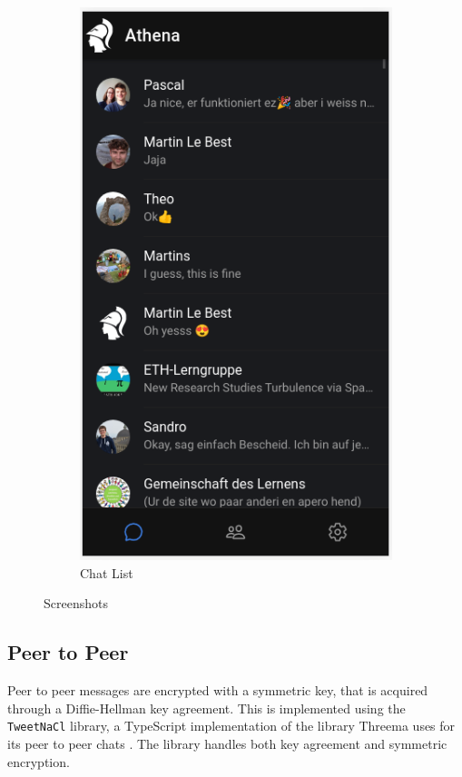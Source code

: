 \documentclass[a4paper, oneside]{discothesis}
\begin{document}
\begin{figure}[h]
\begin{subfigure}{.5\textwidth}
  \includegraphics[width=.8\linewidth]{figures/chats.png}
  \caption{Chat List}
  \label{fig:chats}
\end{subfigure}
\caption{Screenshots}
\label{fig:screenshots}
\end{figure}

\subsection{Peer to Peer}

Peer to peer messages are encrypted with a symmetric key, that is acquired through a Diffie-Hellman key agreement. This is implemented using the \texttt{TweetNaCl} library, a TypeScript implementation of the library Threema uses for its peer to peer chats \cite{Threema, TweetNaCl}. The library handles both key agreement and symmetric encryption.
\end{document}
